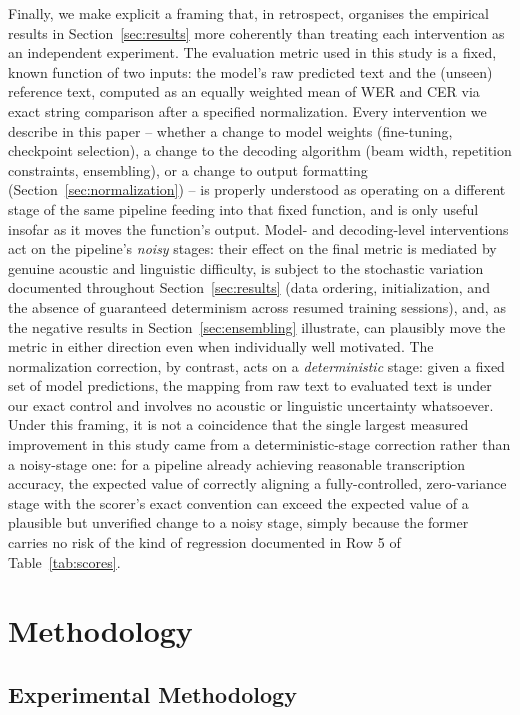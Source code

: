 \documentclass[11pt]{article}
\begin{document}
Finally, we make explicit a framing that, in retrospect, organises the empirical results in Section~\ref{sec:results} more coherently than treating each intervention as an independent experiment. The evaluation metric used in this study is a fixed, known function of two inputs: the model's raw predicted text and the (unseen) reference text, computed as an equally weighted mean of WER and CER via exact string comparison after a specified normalization. Every intervention we describe in this paper -- whether a change to model weights (fine-tuning, checkpoint selection), a change to the decoding algorithm (beam width, repetition constraints, ensembling), or a change to output formatting (Section~\ref{sec:normalization}) -- is properly understood as operating on a different stage of the same pipeline feeding into that fixed function, and is only useful insofar as it moves the function's output. Model- and decoding-level interventions act on the pipeline's \emph{noisy} stages: their effect on the final metric is mediated by genuine acoustic and linguistic difficulty, is subject to the stochastic variation documented throughout Section~\ref{sec:results} (data ordering, initialization, and the absence of guaranteed determinism across resumed training sessions), and, as the negative results in Section~\ref{sec:ensembling} illustrate, can plausibly move the metric in either direction even when individually well motivated. The normalization correction, by contrast, acts on a \emph{deterministic} stage: given a fixed set of model predictions, the mapping from raw text to evaluated text is under our exact control and involves no acoustic or linguistic uncertainty whatsoever. Under this framing, it is not a coincidence that the single largest measured improvement in this study came from a deterministic-stage correction rather than a noisy-stage one: for a pipeline already achieving reasonable transcription accuracy, the expected value of correctly aligning a fully-controlled, zero-variance stage with the scorer's exact convention can exceed the expected value of a plausible but unverified change to a noisy stage, simply because the former carries no risk of the kind of regression documented in Row 5 of Table~\ref{tab:scores}.

\section{Methodology}

\subsection{Experimental Methodology}
\label{sec:expmethod}
\end{document}
